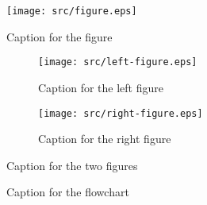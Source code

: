 

%

\newpage


\vfill

\begin{figure}[h!]
    \centering
    \texttt{[image: src/figure.eps]}
    \caption{Caption for the figure}
    \label{fig:figure}
\end{figure}

\vfill


\begin{figure}[h!]
    \centering
    \begin{subfigure}[b]{0.45\textwidth}
        \texttt{[image: src/left-figure.eps]}
        \caption{Caption for the left figure}\label{fig:left-figure}
    \end{subfigure}
    \hfill
    \begin{subfigure}[b]{0.45\textwidth}
        \texttt{[image: src/right-figure.eps]}
        \caption{Caption for the right figure}\label{fig:right-figure}
    \end{subfigure}

    \caption{Caption for the two figures}
    \label{fig:two-figures}
\end{figure}

\vfill


\begin{figure}[h!]
    \centering
    
    \caption{Caption for the flowchart}
    \label{fig:flowchart}
\end{figure}

\vfill

